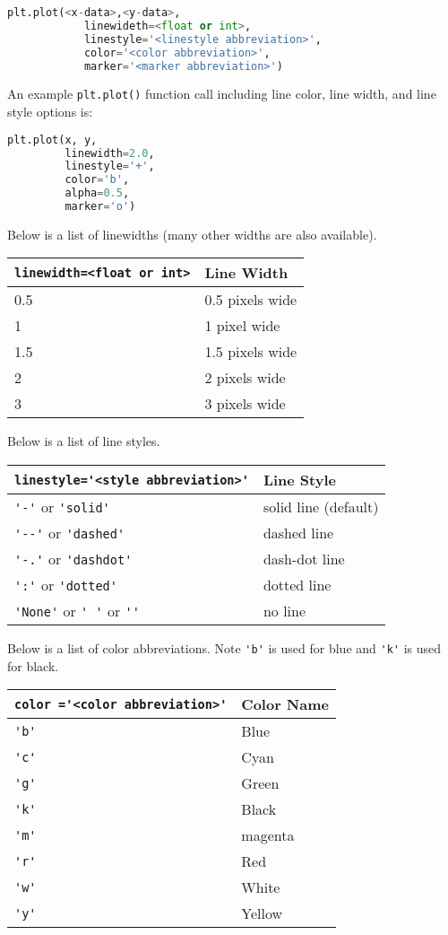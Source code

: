 \documentclass{book}
\newcommand{\passthrough}[1]{#1}
\begin{document}
\begin{lstlisting}[language=Python]
plt.plot(<x-data>,<y-data>,
            linewideth=<float or int>,
            linestyle='<linestyle abbreviation>',
            color='<color abbreviation>',
            marker='<marker abbreviation>')
\end{lstlisting}

An example \passthrough{\lstinline!plt.plot()!} function call including
line color, line width, and line style options is:

\begin{lstlisting}[language=Python]
plt.plot(x, y,
         linewidth=2.0,
         linestyle='+',
         color='b',
         alpha=0.5,
         marker='o')
\end{lstlisting}

Below is a list of linewidths (many other widths are also available).

\begin{longtable}[]{@{}ll@{}}
\toprule
\passthrough{\lstinline!linewidth=<float or int>!} & Line
Width\tabularnewline
\midrule
\endhead
0.5 & 0.5 pixels wide\tabularnewline
1 & 1 pixel wide\tabularnewline
1.5 & 1.5 pixels wide\tabularnewline
2 & 2 pixels wide\tabularnewline
3 & 3 pixels wide\tabularnewline
\bottomrule
\end{longtable}

Below is a list of line styles.

\begin{longtable}[]{@{}ll@{}}
\toprule
\passthrough{\lstinline!linestyle='<style abbreviation>'!} & Line
Style\tabularnewline
\midrule
\endhead
\passthrough{\lstinline!'-'!} or \passthrough{\lstinline!'solid'!} &
solid line (default)\tabularnewline
\passthrough{\lstinline!'--'!} or \passthrough{\lstinline!'dashed'!} &
dashed line\tabularnewline
\passthrough{\lstinline!'-.'!} or \passthrough{\lstinline!'dashdot'!} &
dash-dot line\tabularnewline
\passthrough{\lstinline!':'!} or \passthrough{\lstinline!'dotted'!} &
dotted line\tabularnewline
\passthrough{\lstinline!'None'!} or \passthrough{\lstinline!' '!} or
\passthrough{\lstinline!''!} & no line\tabularnewline
\bottomrule
\end{longtable}

Below is a list of color abbreviations. Note
\passthrough{\lstinline!'b'!} is used for blue and
\passthrough{\lstinline!'k'!} is used for black.

\begin{longtable}[]{@{}ll@{}}
\toprule
\passthrough{\lstinline!color ='<color abbreviation>'!} & Color
Name\tabularnewline
\midrule
\endhead
\passthrough{\lstinline!'b'!} & Blue\tabularnewline
\passthrough{\lstinline!'c'!} & Cyan\tabularnewline
\passthrough{\lstinline!'g'!} & Green\tabularnewline
\passthrough{\lstinline!'k'!} & Black\tabularnewline
\passthrough{\lstinline!'m'!} & magenta\tabularnewline
\passthrough{\lstinline!'r'!} & Red\tabularnewline
\passthrough{\lstinline!'w'!} & White\tabularnewline
\passthrough{\lstinline!'y'!} & Yellow\tabularnewline
\bottomrule
\end{longtable}
\end{document}
